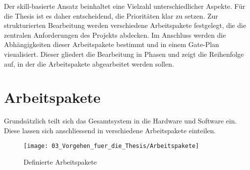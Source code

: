 Der skill-basierte Ansatz beinhaltet eine Vielzahl unterschiedlicher Aspekte. Für die Thesis ist es daher entscheidend, die Prioritäten klar zu setzen. Zur strukturierten Bearbeitung werden verschiedene Arbeitspakete festgelegt, die die zentralen Anforderungen des Projekts abdecken. Im Anschluss werden die Abhängigkeiten dieser Arbeitspakete bestimmt und in einem Gate-Plan visualisiert. Dieser gliedert die Bearbeitung in Phasen und zeigt die Reihenfolge auf, in der die Arbeitspakete abgearbeitet werden sollen.


\section{Arbeitspakete} \label{Arbeitspakete}

	Grundsätzlich teilt sich das Gesamtsystem in die Hardware und Software ein. Diese lassen sich anschliessend in verschiedene Arbeitspakete einteilen. 

	\begin{figure}[h!]
		\centering
		\texttt{[image: 03\_Vorgehen\_fuer\_die\_Thesis/Arbeitspakete]}
		\captionsetup{justification=centering}
		\caption{Definierte Arbeitspakete}
		\label{fig:Arbeitspakete}
	\end{figure}
	
	\newpage

